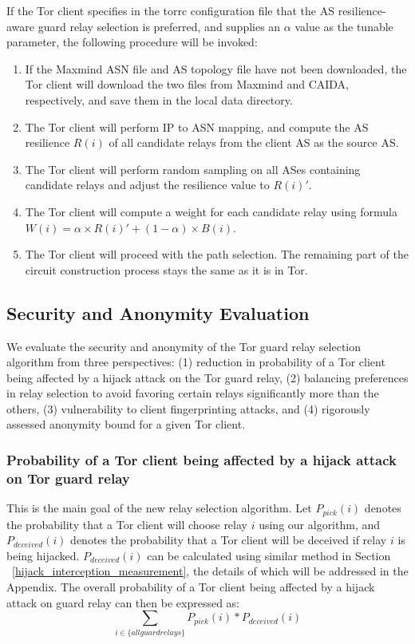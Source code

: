 If the Tor client specifies in the torrc configuration file that the AS resilience-aware guard relay selection is preferred, and supplies an $\alpha$ value as the tunable parameter, the following procedure will be invoked:

\begin{enumerate}
\item If the Maxmind ASN file and AS topology file have not been downloaded, the Tor client will download the two files from Maxmind and CAIDA, respectively, and save them in the local data directory. 
\item The Tor client will perform IP to ASN mapping, and compute the AS resilience $R(i)$ of all candidate relays from the client AS as the source AS. 
\item The Tor client will perform random sampling on all ASes containing candidate relays and adjust the resilience value to $R(i)\prime$.
\item The Tor client will compute a weight for each candidate relay using formula $W(i) = \alpha \times R(i) \prime + (1 - \alpha) \times B(i)$. 
\item The Tor client will proceed with the path selection. The remaining part of the circuit construction process stays the same as it is in Tor. 
\end{enumerate}

\subsection{Security and Anonymity Evaluation}
We evaluate the security and anonymity of the Tor guard relay selection algorithm from three perspectives: (1) reduction in probability of a Tor client being affected by a hijack attack on the Tor guard relay, (2) balancing preferences in relay selection to avoid favoring certain relays significantly more than the others, (3) vulnerability to client fingerprinting attacks, and (4) rigorously assessed anonymity bound for a given Tor client. 

\subsubsection{Probability of a Tor client being affected by a hijack attack on Tor guard relay}
\label{attack_probability}
This is the main goal of the new relay selection algorithm. Let $P_{pick}(i)$ denotes the probability that a Tor client will choose relay $i$ using our algorithm, and $P_{deceived}(i)$ denotes the probability that a Tor client will be deceived if relay $i$ is being hijacked. $P_{deceived}(i)$ can be calculated using similar method in Section ~\ref{hijack_interception_measurement}, the details of which will be addressed in the Appendix. The overall probability of a Tor client being affected by a hijack attack on guard relay can then be expressed as:
\begin{equation*}
\sum_{i \in \{all guard relays\}} P_{pick}(i) * P_{deceived}(i)
\end{equation*}


